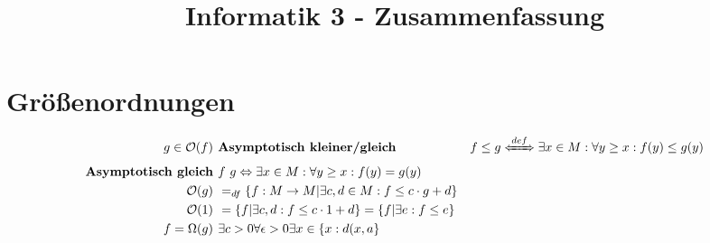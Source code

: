 \documentclass{article}
\title{Informatik 3 - Zusammenfassung}
\begin{document}
	\section*{Gr\"o\ss enordnungen}
		\begin{align*}
			\textbf{$g \in \mathcal{O}(f)$ } & \text{}
			\textbf{Asymptotisch kleiner/gleich } & f \leq g \xLeftrightarrow{def} \exists x \in M: \forall y \geq x: f(y) \leq g(y)\\
			\textbf{Asymptotisch gleich } & f ~ g \Leftrightarrow \exists x \in M: \forall y \geq x: f(y) = g(y)\\
			\textbf{$\mathcal{O}(g)$ } & =_{df} \{f: M \rightarrow M | \exists c, d \in M: f \leq c \cdot g + d\}\\
			\textbf{$\mathcal{O}(1)$ } & = \{f | \exists c, d: f \leq c \cdot 1 + d \} = \{f | \exists e: f \leq e\}\\
			\textbf{$f = \Omega(g)$ } & \exists c > 0 \forall \epsilon > 0 \exists x \in \{x: d(x,a\}\\
		\end{align*}
\end{document}
